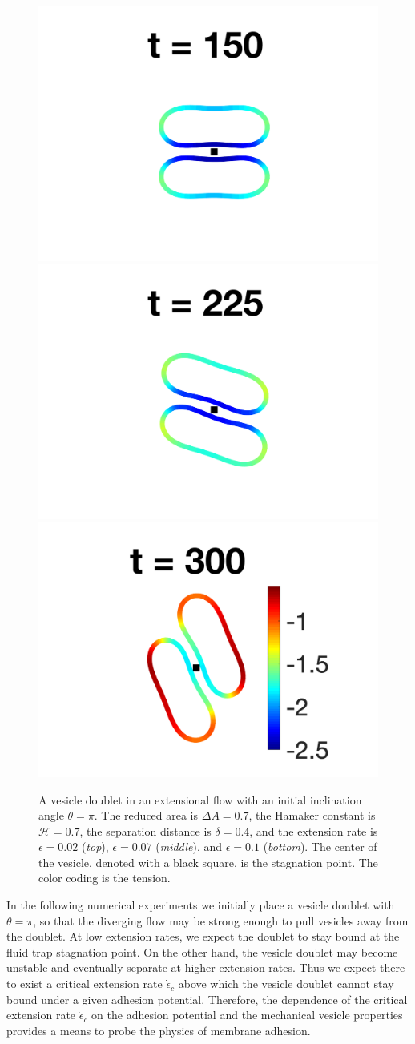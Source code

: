 \documentclass[prf,superscriptaddress,showkeys,longbibliography]{revtex4-1}
\begin{document}
\begin{figure}[htp]
  \includegraphics[height = 0.18\textwidth,trim={4cm 1cm 4cm 1cm},clip]
    {figs/extensional_adR4em1adS7em1Chi1em1_ra070_tension_image03.png}
  \includegraphics[height = 0.18\textwidth,trim={4cm 1cm 4cm 1cm},clip]
    {figs/extensional_adR4em1adS7em1Chi1em1_ra070_tension_image04.png}
  \includegraphics[height = 0.18\textwidth,trim={4cm 1cm 3cm 1cm},clip]
    {figs/extensional_adR4em1adS7em1Chi1em1_ra070_tension_image05.png}
  \caption{\label{fig:extensional1} A vesicle doublet in an extensional
  flow with an initial inclination angle $\theta=\pi$.  The reduced area
  is $\Delta A = 0.7$, the Hamaker constant is $\mathcal{H} = 0.7$, the
  separation distance is $\delta = 0.4$, and the extension rate is
  $\dot\epsilon = 0.02$ ({\em top}), $\dot\epsilon=0.07$ ({\em middle}),
  and $\dot\epsilon = 0.1$ ({\em bottom}).  The center of the vesicle,
  denoted with a black square, is the stagnation point.  The color
  coding is the tension.}
  \end{figure}

In the following numerical experiments we initially place a vesicle
doublet with $\theta=\pi$, so that the diverging flow may be strong
enough to pull vesicles away from the doublet.  At low extension rates,
we expect the doublet to stay bound at the fluid trap stagnation point.
On the other hand, the vesicle doublet may become unstable and
eventually separate at higher extension rates.  Thus we expect there to
exist a critical extension rate $\dot\epsilon_c$ above which the vesicle
doublet cannot stay bound under a given adhesion potential.  Therefore,
the dependence of the critical extension rate $\dot\epsilon_c$ on the
adhesion potential and the mechanical vesicle properties provides a
means to probe the physics of membrane adhesion.
\end{document}
